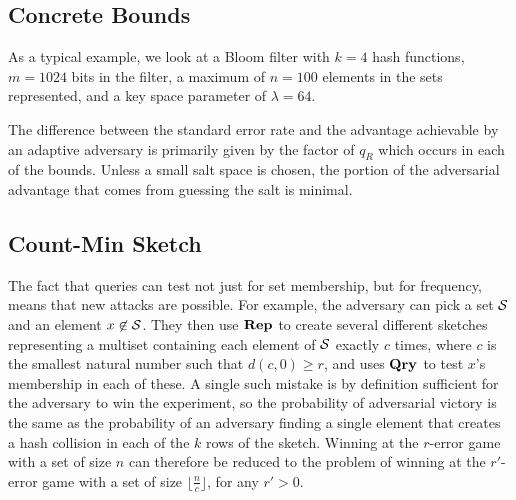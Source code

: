 \subsection{Concrete Bounds}

As a typical example, we look at a Bloom filter with $k = 4$ hash functions, $m = 1024$ bits in the filter, a maximum of $n = 100$ elements in the sets represented, and a key space parameter of $\lambda = 64$.

The difference between the standard error rate and the advantage achievable by an adaptive adversary is primarily given by the factor of $q_R$ which occurs in each of the bounds. Unless a small salt space is chosen, the portion of the adversarial advantage that comes from guessing the salt is minimal.


\subsection{Count-Min Sketch}



The fact that queries can test not just for set membership, but for frequency, means that new attacks are possible. For example, the adversary can pick a set $\mathcal{S}$ and an element $x \not\in \mathcal{S}$. They then use $\mathbf{Rep}\hspace{0.5pt}$ to create several different sketches representing a multiset containing each element of $\mathcal{S}$ exactly $c$ times, where $c$ is the smallest natural number such that $d(c,0) \ge r$, and uses $\mathbf{Qry}\hspace{0.5pt}$ to test $x$'s membership in each of these. A single such mistake is by definition sufficient for the adversary to win the experiment, so the probability of adversarial victory is the same as the probability of an adversary finding a single element that creates a hash collision in each of the $k$ rows of the sketch. Winning at the $r$-error game with a set of size $n$ can therefore be reduced to the problem of winning at the $r'$-error game with a set of size $\lfloor\frac{n}{c}\rfloor$, for any $r' > 0$.

